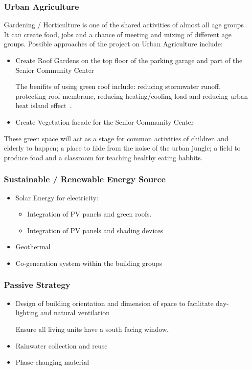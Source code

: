 \subsubsection{Urban Agriculture}
Gardening / Horticulture is one of the shared activities of almost all
age groups . It can create food, jobs and a chance of meeting and
mixing of different age groups. Possible approaches of the project on
Urban Agriculture include:
\begin{itemize}
\item Create Roof Gardens on the top floor of the parking garage and
  part of the Senior Community Center

The benifits of using green roof include: reducing stormwater runoff,
protecting roof membrane, reducing heating/cooling load and reducing
urban heat island effect~\cite{Snodgrass2010}.
\item Create Vegetation facade for the Senior Community Center
\end{itemize}
These green space will act as a stage for common activities of
children and elderly to happen; a place to hide from the noise of the
urban jungle; a field to produce food and a classroom for teaching
healthy eating habbits.

\subsubsection{Sustainable / Renewable Energy Source}
\begin{itemize}
\item Solar Energy for electricity: 
  \begin{itemize}
  \item Integration of PV panels and green roofs.
  \item Integration of PV panels and shading devices
  \end{itemize}
\item Geothermal
\item Co-generation system within the building groups
\end{itemize}
\subsubsection{Passive Strategy}
\begin{itemize}
\item Design of building orientation and dimension of space to
  facilitate day-lighting and natural ventilation

Ensure all living units have a south facing window.
\item Rainwater collection and reuse
\item Phase-changing material
\end{itemize}
